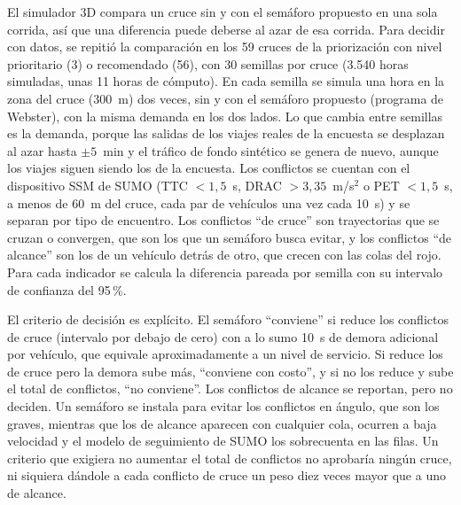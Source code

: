 El simulador 3D compara un cruce sin y con el semáforo propuesto en una sola corrida, así que una diferencia puede deberse al azar de esa corrida. Para decidir con datos, se repitió la comparación en los 59 cruces de la priorización con nivel prioritario (3) o recomendado (56), con 30 semillas por cruce (3.540 horas simuladas, unas 11 horas de cómputo). En cada semilla se simula una hora en la zona del cruce (300~m) dos veces, sin y con el semáforo propuesto (programa de Webster), con la misma demanda en los dos lados. Lo que cambia entre semillas es la demanda, porque las salidas de los viajes reales de la encuesta se desplazan al azar hasta $\pm 5$~min y el tráfico de fondo sintético se genera de nuevo, aunque los viajes siguen siendo los de la encuesta. Los conflictos se cuentan con el dispositivo SSM de SUMO (TTC $<1{,}5$~s, DRAC $>3{,}35$~m/s$^2$ o PET $<1{,}5$~s, a menos de 60~m del cruce, cada par de vehículos una vez cada 10~s) y se separan por tipo de encuentro. Los conflictos “de cruce” son trayectorias que se cruzan o convergen, que son los que un semáforo busca evitar, y los conflictos “de alcance” son los de un vehículo detrás de otro, que crecen con las colas del rojo. Para cada indicador se calcula la diferencia pareada por semilla con su intervalo de confianza del 95\,\%.

El criterio de decisión es explícito. El semáforo “conviene” si reduce los conflictos de cruce (intervalo por debajo de cero) con a lo sumo 10~s de demora adicional por vehículo, que equivale aproximadamente a un nivel de servicio. Si reduce los de cruce pero la demora sube más, “conviene con costo”, y si no los reduce y sube el total de conflictos, “no conviene”. Los conflictos de alcance se reportan, pero no deciden. Un semáforo se instala para evitar los conflictos en ángulo, que son los graves, mientras que los de alcance aparecen con cualquier cola, ocurren a baja velocidad y el modelo de seguimiento de SUMO los sobrecuenta en las filas. Un criterio que exigiera no aumentar el total de conflictos no aprobaría ningún cruce, ni siquiera dándole a cada conflicto de cruce un peso diez veces mayor que a uno de alcance.

